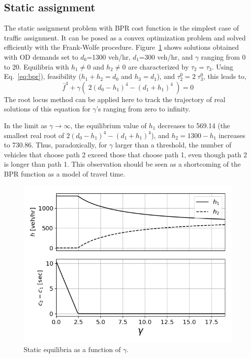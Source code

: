 \subsection{Static assignment}
The static assignment problem with BPR cost function is the simplest case of traffic assignment. It can be posed as a convex optimization problem and solved efficiently with the Frank-Wolfe procedure. Figure~\ref{fig:static} shows solutions obtained with OD demands set to $d_0$=1300 veh/hr, $d_1$=300 veh/hr, and $\gamma$ ranging from 0 to 20. Equilibria with $h_1\neq 0$ and $h_2\neq 0$ are characterized by $\tau_2=\tau_3$. Using Eq.~\ref{eq:bpr}), feasibility ($h_1+h_2=d_0$ and $h_3=d_1$), and $\tau^0_2=2\;\tau^0_3$, this leads to,
\begin{equation}
\bar{f}^4 + \gamma\left(\;2(d_0-h_1)^4 - (d_1+h_1)^4 \;\right) = 0
\end{equation}
The root locus method \cite{rootlocus} can be applied here to track the trajectory of real solutions of this equation for $\gamma$'s ranging from zero to infinity.

In the limit as $\gamma\rightarrow\infty$, the equilibrium value of $h_1$ decreases to 569.14 (the smallest real root of $2(d_0-h_1)^4 - (d_1+h_1)^4$), and $h_2=1300-h_1$ increases to 730.86. Thus, paradoxically, for $\gamma$ larger than a threshold, the number of vehicles that choose path 2 exceed those that choose path 1, even though path 2 is longer than path 1. This observation should be seen as a shortcoming of the BPR function as a model of travel time.

\begin{figure}[h]
    \centering
    \includegraphics[width=0.8\linewidth]{figs/static.png}
    \caption{Static equilibria as a function of $\gamma$.}
    \label{fig:static}
\end{figure}

